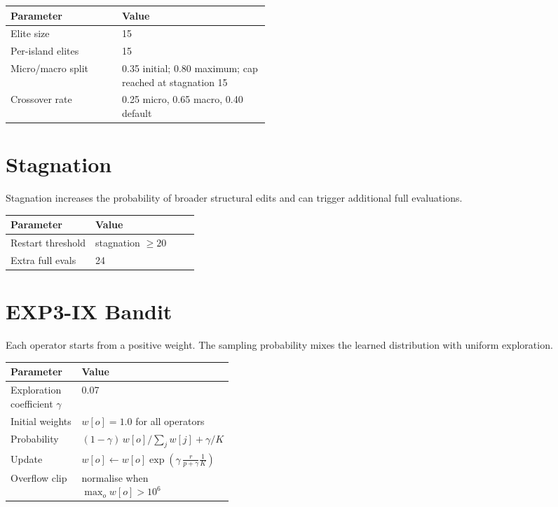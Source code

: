 ﻿\documentclass[10pt,twocolumn]{article}
\newenvironment{hptable}{%
  \begin{tcolorbox}[tablebox]
  \footnotesize
  \renewcommand{\arraystretch}{1.12}
  \setlength{\tabcolsep}{3.0pt}
}{%
  \end{tcolorbox}
}
\begin{document}
\begin{hptable}
\begin{tabularx}{\linewidth}{@{}W{0.43\linewidth}Y@{}}
\toprule
\textbf{Parameter} & \textbf{Value} \\
\midrule
Elite size & 15 \\
Per-island elites & 15 \\
Micro/macro split & 0.35 initial; 0.80 maximum; cap reached at stagnation 15 \\
Crossover rate & 0.25 micro, 0.65 macro, 0.40 default \\
\bottomrule
\end{tabularx}
\end{hptable}

\section{Stagnation}
Stagnation increases the probability of broader structural edits and can trigger additional full evaluations.

\begin{hptable}
\begin{tabularx}{\linewidth}{@{}W{0.45\linewidth}Y@{}}
\toprule
\textbf{Parameter} & \textbf{Value} \\
\midrule
Restart threshold & stagnation $\geq 20$ \\
Extra full evals & 24 \\
\bottomrule
\end{tabularx}
\end{hptable}

\section{EXP3-IX Bandit}
Each operator starts from a positive weight. The sampling probability mixes the learned distribution with uniform exploration.

\begin{hptable}
\begin{tabularx}{\linewidth}{@{}W{0.37\linewidth}Y@{}}
\toprule
\textbf{Parameter} & \textbf{Value} \\
\midrule
Exploration coefficient $\gamma$ & 0.07 \\
Initial weights & $w[o]=1.0$ for all operators \\
Probability & $(1-\gamma)\,w[o]/\sum_j w[j]+\gamma/K$ \\
Update & $w[o]\leftarrow w[o]\exp\!\left(\gamma\,\frac{r}{p+\gamma}\frac{1}{K}\right)$ \\
Overflow clip & normalise when $\max_o w[o] > 10^6$ \\
\bottomrule
\end{tabularx}
\end{hptable}
\end{document}
